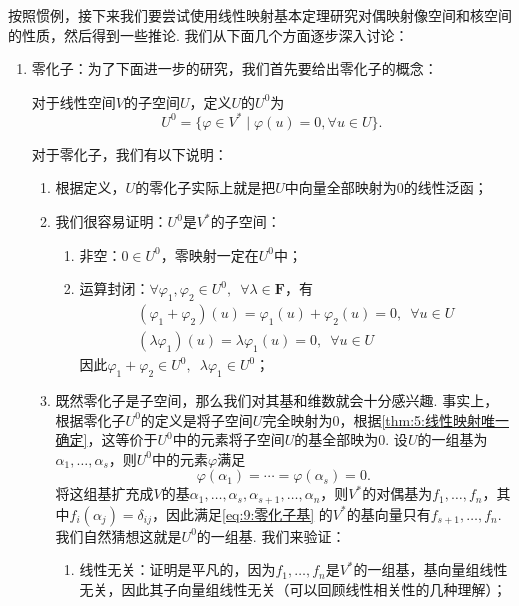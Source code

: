 按照惯例，接下来我们要尝试使用线性映射基本定理研究对偶映射像空间和核空间的性质，然后得到一些推论. 我们从下面几个方面逐步深入讨论：
\begin{enumerate}
    \item 零化子：为了下面进一步的研究，我们首先要给出零化子的概念：
          \begin{definition}[零化子] 
              对于线性空间$V$的子空间$U$，定义$U$的$U^0$为
              \[U^0=\{\varphi\in V^*\mid\varphi(u)=0,\forall u\in U\}.\]
          \end{definition}

          对于零化子，我们有以下说明：
          \begin{enumerate}
              \item 根据定义，$U$的零化子实际上就是把$U$中向量全部映射为0的线性泛函；

              \item 我们很容易证明：$U^0$是$V^*$的子空间：
                    \begin{enumerate}
                        \item 非空：$0\in U^0$，零映射一定在$U^0$中；

                        \item 运算封闭：$\forall\varphi_1,\varphi_2\in U^0,\enspace \forall\lambda\in\mathbf{F}$，有
                              \begin{gather*}
                                  (\varphi_1+\varphi_2)(u)=\varphi_1(u)+\varphi_2(u)=0,\enspace\forall u\in U \\
                                  (\lambda\varphi_1)(u)=\lambda\varphi_1(u)=0,\enspace\forall u\in U
                              \end{gather*}
                              因此$\varphi_1+\varphi_2\in U^0,\enspace \lambda\varphi_1\in U^0$；
                    \end{enumerate}

              \item 既然零化子是子空间，那么我们对其基和维数就会十分感兴趣. 事实上，根据零化子$U^0$的定义是将子空间$U$完全映射为0，根据\autoref{thm:5:线性映射唯一确定}，这等价于$U^0$中的元素将子空间$U$的基全部映为0. 设$U$的一组基为$\alpha_1,\ldots,\alpha_s$，则$U^0$中的元素$\varphi$满足
                    \begin{equation}\label{eq:9:零化子基}
                        \varphi(\alpha_1)=\cdots=\varphi(\alpha_s)=0.
                    \end{equation}
                    将这组基扩充成$V$的基$\alpha_1,\ldots,\alpha_s,\alpha_{s+1},\ldots,\alpha_n$，则$V^*$的对偶基为$f_1,\ldots,f_n$，其中$f_i(\alpha_j)=\delta_{ij}$，因此满足\autoref{eq:9:零化子基} 的$V^*$的基向量只有$f_{s+1},\ldots,f_n$. 我们自然猜想这就是$U^0$的一组基. 我们来验证：
                    \begin{enumerate}
                        \item 线性无关：证明是平凡的，因为$f_1,\ldots,f_n$是$V^*$的一组基，基向量组线性无关，因此其子向量组线性无关（可以回顾线性相关性的几种理解）；


\end{enumerate}
\end{enumerate}
\end{enumerate}
